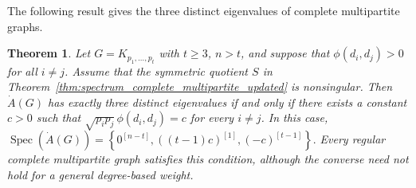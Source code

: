 \documentclass[12pt,twoside]{article}
\newcommand{\spec}{\operatorname{Spec}}
\newtheorem{theorem}{Theorem}[section]
\begin{document}
The following result gives the three distinct eigenvalues of complete multipartite graphs.

\begin{theorem}\label{cor:regular_complete_multipartite_updated}
	Let $G=K_{p_1,\ldots,p_t}$ with $t\geq 3$, $n>t$, and suppose that $\phi(d_i,d_j)>0$ for all $i\neq j$. Assume that the symmetric quotient $S$ in Theorem~\ref{thm:spectrum_complete_multipartite_updated} is nonsingular. Then $\dot A(G)$ has exactly three distinct eigenvalues if and only if there exists a constant $c>0$ such that
	$
	\sqrt{p_ip_j}\,\phi(d_i,d_j)=c
	$
	for every $i\neq j$. In this case,
	$
	\spec(\dot A(G))
	=
	\left\{
	0^{[n-t]},
	((t-1)c)^{[1]},
	(-c)^{[t-1]}
	\right\}.
	$
	Every regular complete multipartite graph satisfies this condition, although the converse need not hold for a general degree-based weight.
\end{theorem}
\end{document}
